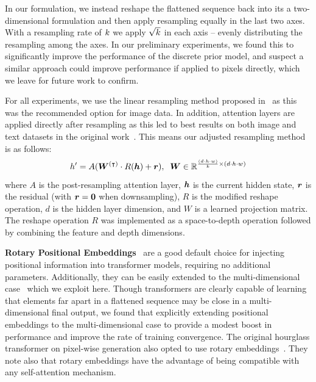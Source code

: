 In our formulation, we instead reshape the flattened sequence back into its a
two-dimensional formulation and then apply resampling equally in the last two axes.
With a resampling rate of $k$ we apply $\sqrt{k}$ in
each axis -- evenly distributing the resampling among the axes. In our
preliminary experiments, we found this to significantly improve the performance
of the discrete prior model, and suspect a similar approach could improve
performance if applied to pixels directly, which we leave for future work to
confirm.

For all experiments, we use the linear resampling method proposed
in~\cite{nawrot2021hierarchical} as this was the recommended option for image
data. In addition, attention layers are applied directly after resampling as
this led to best results on both image and text datasets in the original
work~\cite{nawrot2021hierarchical}. This means our adjusted resampling method is
as follows:
\begin{equation}
    h' = A({\bm{W}}^{(\intercal)} \cdot R({\bm{h}}) + {\bm{r}}), \;\; {\bm{W}} \in
    \mathbb{R}^{\frac{(d \cdot h \cdot w)}{k} \times (d \cdot h \cdot w)}
\end{equation}
where $A$ is the post-resampling attention layer, ${\bm{h}}$ is the current hidden
state, ${\bm{r}}$ is the residual (with ${\bm{r}} = \bm{0}$ when downsampling), $R$ is the
modified reshape operation, $d$ is the hidden layer dimension, and $W$ is a
learned projection matrix. The reshape operation $R$ was implemented as a
space-to-depth operation followed by combining the feature and depth dimensions.

\textbf{Rotary Positional Embeddings}~\cite{su2021roformer} are a good default
choice for injecting positional information into transformer models, requiring
no additional parameters. Additionally, they can be easily extended to the
multi-dimensional case~\cite{rope-eleutherai} which we exploit here. Though
transformers are clearly capable of learning that elements far apart in a
flattened sequence may be close in a multi-dimensional final output, we found
that explicitly extending positional embeddings to the multi-dimensional case to
provide a modest boost in performance and improve the rate of training
convergence. The original hourglass transformer on pixel-wise generation also
opted to use rotary embeddings~\cite{nawrot2021hierarchical}. They note also
that rotary embeddings have the advantage of being compatible with any
self-attention mechanism.

